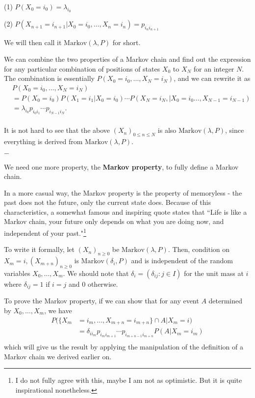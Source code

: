 \documentclass[11pt, a4paper, oneside]{book}
\theoremstyle{definition}
\newcommand{\markov}[2]{\text{Markov}(#1, #2)}
\newcommand{\breaking}{%
    \begin{center}
    $-$
    \end{center}%
}
\begin{document}
(1) $P(X_0 = i_0) = \lambda_{i_0}$

(2) $P(X_{n+1} = i_{n+1} \vert X_0 = i_0, \dots, X_n = i_n) = p_{i_n i_{n+1}}$

\noindent We will then call it $\markov{\lambda}{P}$ for short. 

\noindent We can combine the two properties of a Markov chain and find out the expression for any particular combination of positions of states $X_0$ to $X_N$ for an integer $N$. The combination is essentially $P(X_0 = i_0, \dots, X_N = i_N)$, and we can rewrite it as
\begin{equation*}
\begin{split}
&P(X_0 = i_0, \dots, X_N = i_N) \\
&= P(X_0 = i_0) P(X_1 = i_1 \vert X_0 = i_0) \cdots P(X_N = i_N, \vert X_0 = i_0 \dots, X_{N-1} = i_{N-1}) \\
&= \lambda_{i_0} p_{i_0 i_1} \cdots p_{i_{N-1} i_N}. \\
\end{split}
\end{equation*}

\noindent It is not hard to see that the above $(X_n)_{0 \le n \le N}$ is also $\markov{\lambda}{P}$, since everything is derived from $\markov{\lambda}{P}$.

\breaking

\noindent We need one more property, the \textbf{Markov property}, to fully define a Markov chain.

\noindent In a more casual way, the Markov property is the property of memoryless - the past does not the future, only the current state does. Because of this characteristics, a somewhat famous and inspiring quote states that ``Life is like a Markov chain, your future only depends on what you are doing now, and independent of your past."\footnote{I do not fully agree with this, maybe I am not as optimistic. But it is quite inspirational nonetheless.}

\noindent To write it formally, let $(X_n)_{n \ge 0}$ be $\markov{\lambda}{P}$. Then, condition on $X_m = i, (X_{m+n})_{n \ge 0}$ is $\markov{\delta_i}{P}$ and is independent of the random variables $X_0, \dots, X_m$. We should note that $\delta_i = (\delta_{ij} : j \in I)$ for the unit mass at $i$ where $\delta_{ij} = 1$ if $i = j$ and $0$ otherwise. 

\noindent To prove the Markov property, if we can show that for any event $A$ determined by $X_0, \dots, X_m$, we have 
\begin{equation*}
\begin{split}
P(\{ X_m &= i_m, \dots, X_{m+n} = i_{m+n}\} \cap A \vert X_m = i) \\
&= \delta_{ii_m} p_{i_m i_{m+1}} \cdots p_{i_{m+n-1} i_{m+n}} P(A \vert X_m = i_m) \\
\end{split}
\end{equation*}
which will give us the result by applying the manipulation of the definition of a Markov chain we derived earlier on. 
\end{document}

